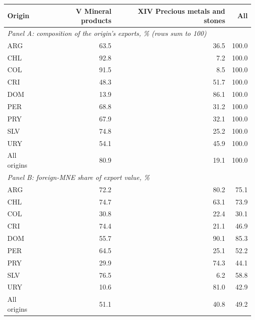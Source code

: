 \begin{tabular}{lrrr}
\toprule
Origin & V Mineral products & XIV Precious metals and stones & All \\
\midrule
\multicolumn{4}{l}{\textit{Panel A: composition of the origin's exports, \% (rows sum to 100)}} \\
ARG & 63.5 & 36.5 & 100.0 \\
CHL & 92.8 & 7.2 & 100.0 \\
COL & 91.5 & 8.5 & 100.0 \\
CRI & 48.3 & 51.7 & 100.0 \\
DOM & 13.9 & 86.1 & 100.0 \\
PER & 68.8 & 31.2 & 100.0 \\
PRY & 67.9 & 32.1 & 100.0 \\
SLV & 74.8 & 25.2 & 100.0 \\
URY & 54.1 & 45.9 & 100.0 \\
All origins & 80.9 & 19.1 & 100.0 \\
\midrule
\multicolumn{4}{l}{\textit{Panel B: foreign-MNE share of export value, \%}} \\
ARG & 72.2 & 80.2 & 75.1 \\
CHL & 74.7 & 63.1 & 73.9 \\
COL & 30.8 & 22.4 & 30.1 \\
CRI & 74.4 & 21.1 & 46.9 \\
DOM & 55.7 & 90.1 & 85.3 \\
PER & 64.5 & 25.1 & 52.2 \\
PRY & 29.9 & 74.3 & 44.1 \\
SLV & 76.5 & 6.2 & 58.8 \\
URY & 10.6 & 81.0 & 42.9 \\
All origins & 51.1 & 40.8 & 49.2 \\
\bottomrule
\end{tabular}
